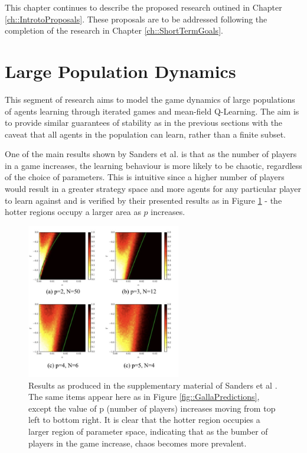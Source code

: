\documentclass[.../main.tex]{subfiles}
\begin{document}
    This chapter continues to describe the proposed research outined in Chapter 
    \ref{ch::IntrotoProposals}. These proposals are to be addressed following the completion of the
    research in Chapter \ref{ch::ShortTermGoals}.


    \section{Large Population Dynamics} \label{sec::Large_Agent_Dynamics}

    This segment of research aims to model the game dynamics of large
    populations of agents learning through iterated games and
    mean-field Q-Learning. The aim is to provide similar guarantees of
    stability as in the previous sections with the caveat that all
    agents in the population can learn, rather than a finite subset.

    One of the main results shown by Sanders et al. \cite{Sanders2018}
    is that as the number of players in a game increases, the learning
    behaviour is more likely to be chaotic, regardless of the choice
    of parameters. This is intuitive since a higher number of players
    would result in a greater strategy space and more agents for any
    particular player to learn against and is verified by their
    presented results as in Figure \ref{fig::GallaPrevalence} - the
    hotter regions occupy a larger area as $p$ increases. 

    \begin{figure}[h]
    	\centering
    	\includegraphics[width=0.6\textwidth]{Figures/GallaPrevalence}
    	\caption{ \label{fig::GallaPrevalence} Results as produced in
          the supplementary material of Sanders et al
          \cite{Sanders2018}. The same items appear here as in Figure
          \ref{fig::GallaPredictions}, except the value of p (number
          of players) increases moving from top left to bottom
          right. It is clear that the hotter region occupies a larger
          region of parameter space, indicating that as the bumber of
          players in the game increase, chaos becomes more prevalent.}
    \end{figure}
\end{document}
